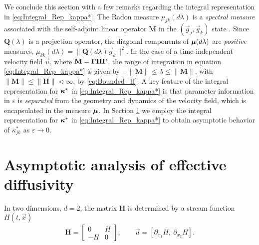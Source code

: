 \documentclass[11pt]{amsart}
\newcommand{\Mb}{\mathbf{M}}
\newcommand{\Hb}{\mathbf{H}}
\newcommand{\Qb}{\mathbf{Q}}
\newcommand\bmu{\mbox{\boldmath${\mu}$}}
\newcommand\bkappa{\mbox{\boldmath${\kappa}$}}
\newcommand\bGamma{\mbox{\boldmath${\Gamma}$}}
\begin{document}
We conclude this section with a few remarks regarding the integral
representation in \eqref{eq:Integral_Rep_kappa*}. The Radon measure
$\mu_{jk}(d\lambda)$ is a \emph{spectral measure} associated with the
self-adjoint linear operator $\Mb$ in the $(\vec{g}_j,\vec{g}_k)$
state \cite{Reed-1980}. Since $\Qb(\lambda)$ is a projection operator, the
diagonal components of $\bmu(d\lambda)$ are \emph{positive} measures, 
$\mu_{kk}(d\lambda)=\|\Qb(d\lambda)\vec{g}_k\|^2$. In the case of a time-independent
velocity field $\vec{u}$, where $\Mb=\bGamma\Hb\bGamma$, the range of
integration in equation \eqref{eq:Integral_Rep_kappa*} is given by
$-\|\Mb\|\leq\lambda\leq\|\Mb\|$, with $\|\Mb\|\leq\|\Hb\|<\infty$, by \eqref{eq:Bounded_H}.  A
key feature of the integral representation for $\bkappa^*$ in
\eqref{eq:Integral_Rep_kappa*} is that parameter information in $\varepsilon$ is
\emph{separated} from the geometry and dynamics of the velocity field,
which is encapsulated in the measure $\bmu$. In Section 
\ref{sec:Assymptotics} we employ the integral representation for
$\bkappa^*$ in \eqref{eq:Integral_Rep_kappa*} to obtain asymptotic
behavior of $\kappa^*_{jk}$ as $\varepsilon\to0$. 









\section{Asymptotic analysis of effective
  diffusivity} \label{sec:Assymptotics} 
In two dimensions, $d=2$, the matrix $\Hb$ is determined by a stream
function $H(t,\vec{x})$ 
%
\begin{align}\label{eq:u_H}  
  \Hb=\left[
  \begin{array}{cc}
    0  & H\\
    -H & 0
  \end{array}
  \right],
  \qquad
  \vec{u}=[\partial_{x_1}H, \ \partial_{x_2}H].
\end{align}
%
\end{document}
